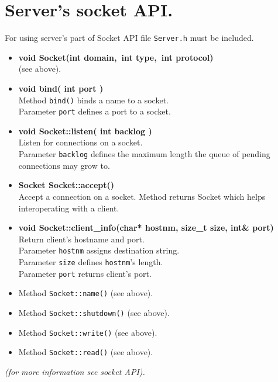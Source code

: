 \documentclass[10pt]{article}
\begin{document}
\section{ Server's socket API. }
 { For using server's part of Socket API file \verb|Server.h|
    must be included. }
  \begin{itemize}
        \item {\bf void Socket(int domain,\ int type,\ int protocol)} \\
              (see above).
        \item { \bf void bind( int port ) } \\
           Method \verb|bind()| binds a name to a socket.\\
           Parameter \verb|port| defines a port to a socket.
        \item {\bf void Socket::listen( int backlog ) } \\
           Listen for connections on a socket.\\ 
           Parameter \verb|backlog| defines the maximum length the queue 
           of pending connections may grow to. 
        \item  { \bf Socket Socket::accept() } \\
           Accept a connection on a socket. Method returns Socket which
           helps interoperating with a client.
         \item { \bf void Socket::client\_info(char* hostnm,
                    size\_t size, int\& port) } \\
           Return client's hostname and port.\\
           Parameter \verb|hostnm| assigns destination string.\\
           Parameter \verb|size| defines \verb|hostnm|'s length.\\
           Parameter \verb|port| returns client's port.
                 \item Method \verb|Socket::name()| (see above).
        \item Method \verb|Socket::shutdown()| (see above).
        \item Method \verb|Socket::write()| (see above).
        \item Method \verb|Socket::read()| (see above).
  \end{itemize} 
  { \sl (for more information see socket API). } \\
\newpage
\end{document}
